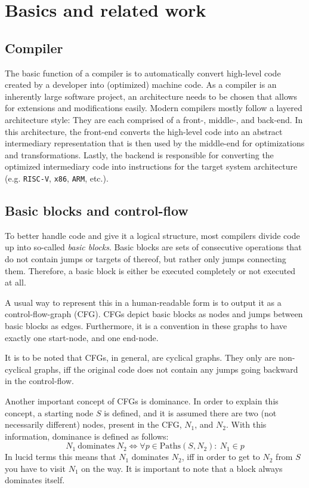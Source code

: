 \chapter{Basics and related work}\label{sec:basics}

\section{Compiler}\label{sec:basics:compiler}

The basic function of a compiler is to automatically convert high-level code created by a developer into (optimized) machine code.
As a compiler is an inherently large software project, an architecture needs to be chosen that allows for extensions and modifications easily.
Modern compilers mostly follow a layered architecture style: They are each comprised of a front-, middle-, and back-end.
In this architecture, the front-end converts the high-level code into an abstract intermediary representation that is then used by the middle-end for optimizations and transformations.
Lastly, the backend is responsible for converting the optimized intermediary code into instructions for the target system architecture (e.g. \texttt{RISC-V}, \texttt{x86}, \texttt{ARM}, etc.).

\section{Basic blocks and control-flow}\label{sec:basics:bb-cf}

To better handle code and give it a logical structure, most compilers divide code up into so-called \textit{basic blocks}.
Basic blocks are sets of consecutive operations that do not contain jumps or targets of thereof, but rather only jumps connecting them.
Therefore, a basic block is either be executed completely or not executed at all.

A usual way to represent this in a human-readable form is to output it as a control-flow-graph (CFG).
CFGs depict basic blocks as nodes and jumps between basic blocks as edges.
Furthermore, it is a convention in these graphs to have exactly one start-node, and one end-node.

It is to be noted that CFGs, in general, are cyclical graphs.
They only are non-cyclical graphs, iff the original code does not contain any jumps going backward in the control-flow.

Another important concept of CFGs is dominance.
In order to explain this concept, a starting node $S$ is defined, and it is assumed there are two (not necessarily different) nodes, present in the CFG, $N_1$, and $N_2$.
With this information, dominance is defined as follows:
$$N_1~\text{dominates}~N_2 \Longleftrightarrow \forall p \in \text{Paths}(S, N_2):~N_1 \in p$$
In lucid terms this means that $N_1$ dominates $N_2$, iff in order to get to $N_2$ from $S$ you have to visit $N_1$ on the way.
It is important to note that a block always dominates itself.

